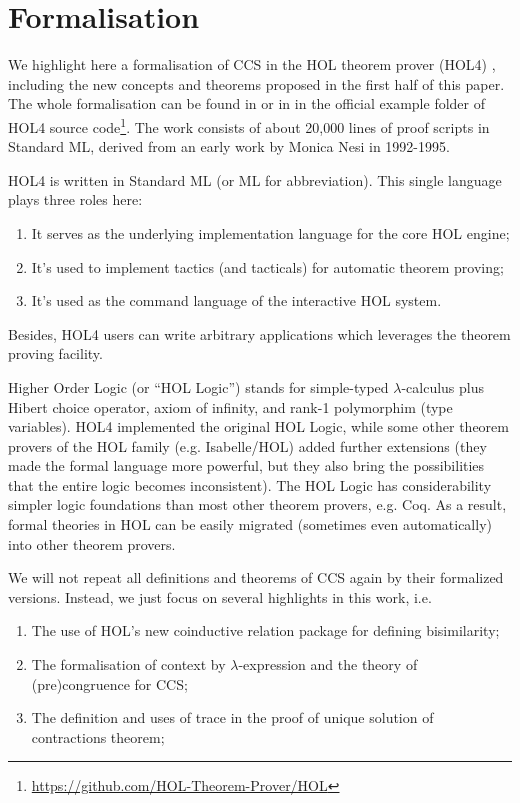 \section{Formalisation}

We highlight here a formalisation of CCS
in the HOL theorem
prover (HOL4) \cite{slind2008brief},
including the new concepts and theorems proposed in the first half of
this paper.
The whole formalisation can be found 
in \cite{Tian:2017wrba}  or in 
 in the official example folder of HOL4 source
code\footnote{\url{https://github.com/HOL-Theorem-Prover/HOL}}. The
work consists of about 20,000 lines of proof scripts in Standard ML,
derived from an early work \cite{Nesi:1992ve} by Monica Nesi in 1992-1995.

HOL4 is written in Standard ML (or ML for abbreviation). This single language plays three roles here:
\begin{enumerate}
\item It serves as the underlying implementation language for the core HOL engine;
\item It's used to implement tactics (and tacticals) for automatic theorem proving;
\item It's used as the command language of the interactive HOL system.
\end{enumerate}
Besides, HOL4 users can write arbitrary applications which leverages
the theorem proving facility. 

Higher Order Logic (or ``HOL Logic'') \cite{hollogic} stands for simple-typed $\lambda$-calculus plus Hibert
choice operator, axiom of infinity, and rank-1 polymorphim (type
variables). HOL4 implemented the original HOL Logic, while
some other theorem provers of the HOL family (e.g. Isabelle/HOL) added
further extensions (they made the formal language more powerful,
but they also bring the possibilities that the entire logic becomes inconsistent).
The HOL Logic has considerability simpler logic
foundations than most other theorem provers, e.g. Coq. As a result,
formal theories in HOL can be easily migrated (sometimes even
automatically) into other theorem provers.

We will not repeat all definitions and theorems of CCS again by their
formalized versions. Instead, we just focus on several highlights in
this work, i.e.
\begin{enumerate}
\item The use of HOL's new coinductive relation package for defining bisimilarity;
\item The formalisation of context by $\lambda$-expression and the theory of
  (pre)congruence for CCS;
\item The definition and uses of trace in the proof of unique solution of
  contractions theorem;
\end{enumerate}

